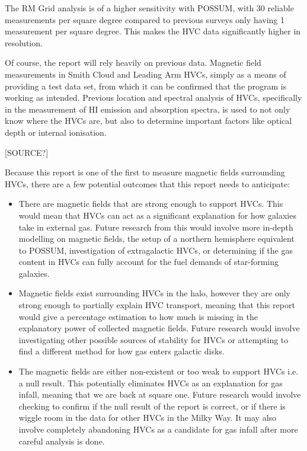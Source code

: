 The RM Grid analysis is of a higher sensitivity with POSSUM, with 30 reliable measurements per square degree compared to previous surveys only having 1 measurement per square degree. This makes the HVC data significantly higher in resolution.

Of course, the report will rely heavily on previous data. Magnetic field measurements in Smith Cloud and Leading Arm HVCs, simply as a means of providing a test data set, from which it can be confirmed that the program is working as intended. Previous location and spectral analysis of HVCs, specifically in the measurement of HI emission and absorption spectra, is used to not only know where the HVCs are, but also to determine important factors like optical depth or internal ionisation.

[SOURCE?]

Because this report is one of the first to measure magnetic fields surrounding HVCs, there are a few potential outcomes that this report needs to anticipate:
\begin{itemize}
\item There are magnetic fields that are strong enough to support HVCs. This would mean that HVCs can act as a significant explanation for how galaxies take in external gas. Future research from this would involve more in-depth modelling on magnetic fields, the setup of a northern hemisphere equivalent to POSSUM, investigation of extragalactic HVCs, or determining if the gas content in HVCs can fully account for the fuel demands of star-forming galaxies.
\item Magnetic fields exist surrounding HVCs in the halo, however they are only strong enough to partially explain HVC transport, meaning that this report would give a percentage estimation to how much is missing in the explanatory power of collected magnetic fields. Future research would involve investigating other possible sources of stability for HVCs or attempting to find a different method for how gas enters galactic disks.
\item The magnetic fields are either non-existent or too weak to support HVCs i.e. a null result. This potentially eliminates HVCs as an explanation for gas infall, meaning that we are back at square one. Future research would involve checking to confirm if the null result of the report is correct, or if there is wiggle room in the data for other HVCs in the Milky Way. It may also involve completely abandoning HVCs as a candidate for gas infall after more careful analysis is done.
\end{itemize}